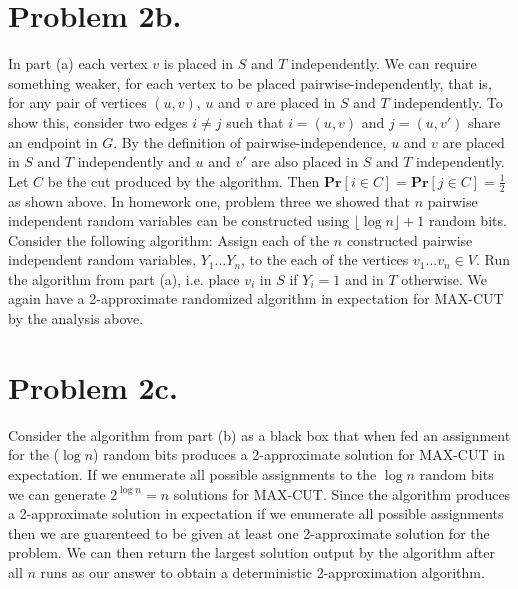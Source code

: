 \documentclass[12pt]{article}
\begin{document}
\section*{Problem 2b.}
In part (a) each vertex $v$ is placed in $S$ and $T$ independently. We can
require something weaker, for each vertex to be placed pairwise-independently,
that is, for any pair of vertices $(u,v)$, $u$ and $v$ are placed in $S$ and $T$
independently. To show this, consider two edges $i \neq j$ such that
$i = (u,v)$ and $j = (u,v')$ share an endpoint in $G$. By the definition of
pairwise-independence, $u$ and $v$ are placed in $S$ and $T$ independently and
$u$ and $v'$ are also placed in $S$ and $T$ independently. Let $C$ be the cut
produced by the algorithm. Then $\textbf{Pr}[i \in C] = \textbf{Pr}[j \in C] =
\frac{1}{2}$ as shown above. In homework one, problem three we showed that $n$
pairwise independent random variables can be constructed using
$\lfloor{\log n}\rfloor + 1$ random bits. Consider the following algorithm:
Assign each of the $n$ constructed pairwise independent random variables,
$Y_1...Y_n$, to the each of the vertices $v_1...v_n \in V$. Run the algorithm
from part (a), i.e. place $v_i$ in $S$ if $Y_i = 1$ and in $T$ otherwise.
We again have a 2-approximate randomized algorithm in expectation for MAX-CUT
by the analysis above.

\section*{Problem 2c.}
Consider the algorithm from part (b) as a black box that when fed an
assignment for the ($\log n$) random bits produces a 2-approximate solution for
MAX-CUT in expectation. If we enumerate all possible assignments to the $\log n$
random bits we can generate $2^{\log n} = n$ solutions for MAX-CUT. Since the
algorithm produces a 2-approximate solution in expectation if we enumerate all
possible assignments then we are guarenteed to be given at least one
2-approximate solution for the problem. We can then return the largest solution
output by the algorithm after all $n$ runs as our answer to obtain a
deterministic 2-approximation algorithm.
\end{document}
